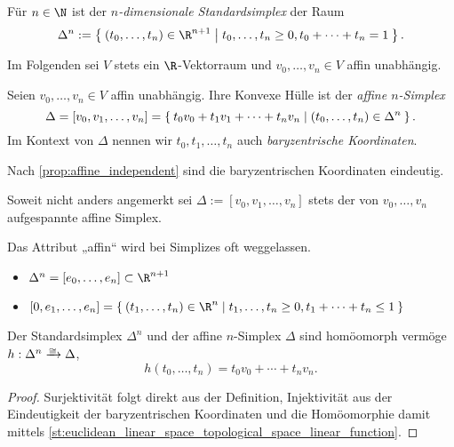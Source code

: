 \begin{df}
	Für $n \in \N$ ist der \emph{$n$-dimensionale Standardsimplex} der Raum
	\[
		\Delta^n := \Set{ (t_0, \dotsc, t_n) \in \R^{n+1} | t_0, \dotsc, t_n \ge 0, t_0 + \dotsb + t_n = 1 }.
	\]
\end{df}

\begin{conv}
	Im Folgenden sei $V$ stets ein $\R$-Vektorraum und $v_0, \dotsc, v_n \in V$ affin unabhängig.
\end{conv}

\begin{df}
	Seien $v_0, \dotsc, v_n \in V$ affin unabhängig.
	Ihre Konvexe Hülle ist der \emph{affine $n$-Simplex}
	\[
		\Delta = [v_0, v_1, \dotsc, v_n]
		= \Set{ t_0v_0 + t_1v_1 + \dotsb + t_nv_n | (t_0, \dotsc, t_n) \in \Delta^n }.
	\]
	Im Kontext von $\Delta$ nennen wir $t_0, t_1, \dotsc, t_n$ auch \emph{baryzentrische Koordinaten}.
	\begin{note}
		Nach \ref{prop:affine_independent} sind die baryzentrischen Koordinaten eindeutig.
	\end{note}
\end{df}

\begin{conv}
	Soweit nicht anders angemerkt sei $\Delta := [v_0, v_1, \dotsc, v_n]$ stets der von $v_0, \dotsc, v_n$ aufgespannte affine Simplex.

	Das Attribut „affin“ wird bei Simplizes oft weggelassen.
\end{conv}

\begin{ex}
	\begin{itemize}
		\item
			$\Delta^n = [e_0, \dotsc, e_n] \subset \R^{n+1}$
		\item
			$[0,e_1,\dotsc,e_n] = \Set{ (t_1, \dotsc, t_n) \in \R^n | t_1, \dotsc, t_n \ge 0, t_1 + \dotsb + t_n \le 1 }$
	\end{itemize}
\end{ex}

\begin{nt} \label{nt:standard_simplex_affine_simplex_homeomorphism}
	Der Standardsimplex $\Delta^n$ und der affine $n$-Simplex $\Delta$ sind homöomorph vermöge $h: \Delta^n \homto \Delta$,
	\[
		h(t_0, \dotsc, t_n) = t_0 v_0 + \dotsb + t_n v_n.
	\]
	\begin{proof}
		Surjektivität folgt direkt aus der Definition, Injektivität aus der Eindeutigkeit der baryzentrischen Koordinaten und die Homöomorphie damit mittels \ref{st:euclidean_linear_space_topological_space_linear_function}.
	\end{proof}
\end{nt}

